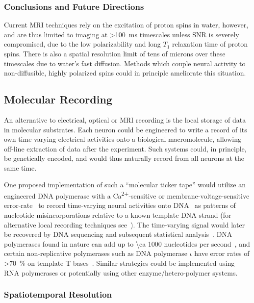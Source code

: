 \subsubsection{Conclusions and Future Directions}

Current MRI techniques rely on the excitation of proton spins in water, however, and are thus limited to imaging at \SI{>100}{\ms} timescales unless SNR is severely compromised, due to the low polarizability and long $T_1$ relaxation time of proton spins.
There is also a spatial resolution limit of tens of microns over these timescales due to water's fast diffusion. Methods which couple neural activity to non-diffusible, highly polarized spins could in principle ameliorate this situation.

\subsection{Molecular Recording}

An alternative to electrical, optical or MRI recording is the local storage of data in molecular substrates.
Each neuron could be engineered to write a record of its own time-varying electrical activities onto a biological macromolecule, allowing off-line extraction of data after the experiment.
Such systems could, in principle, be genetically encoded, and would thus naturally record from all neurons at the same time.

One proposed implementation of such a ``molecular ticker tape'' would utilize an engineered DNA polymerase with a Ca\textsuperscript{2$+$}-sensitive or membrane-voltage-sensitive error-rate~\cite{zamft12} to record time-varying neural activities onto DNA~\cite{glaser13} as patterns of nucleotide misincorporations relative to a known template DNA strand (for alternative local recording techniques see~\cite{friedland09,bonnet13}).
The time-varying signal would later be recovered by DNA sequencing and subsequent statistical analysis~\cite{glaser13}.
DNA polymerases found in nature can add up to \num{\ca 1000} nucleotides per second~\cite{kelman95}, and certain non-replicative polymerases such as DNA polymerase $\iota$ have error rates of \SI{>70}{\percent} on template T bases~\cite{frank07}.
Similar strategies could be implemented using RNA polymerases or potentially using other enzyme/hetero-polymer systems.

\subsubsection{Spatiotemporal Resolution}

